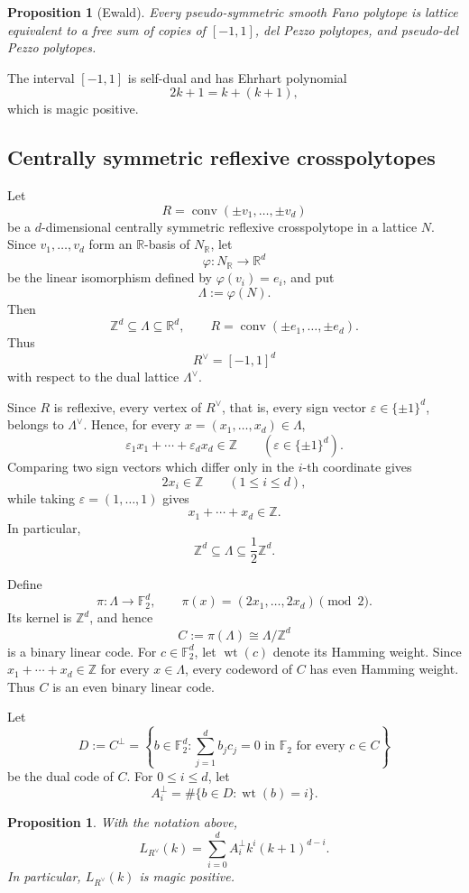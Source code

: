 \documentclass[10pt,a4paper]{amsart}
\newtheorem{Proposition}[Theorem]{Proposition}
\theoremstyle{definition}
\newcommand{\ZZ}{\mathbb Z}
\newcommand{\RR}{\mathbb R}
\newcommand{\conv}{\operatorname{conv}}
\begin{document}
\begin{Proposition}[Ewald]\label{prop:smooth-classification}
Every pseudo-symmetric smooth Fano polytope is lattice equivalent to a
free sum of copies of $[-1,1]$, del Pezzo polytopes, and pseudo-del Pezzo
polytopes.
\end{Proposition}


The interval $[-1,1]$ is self-dual and has Ehrhart polynomial
\[
2k+1=k+(k+1),
\]
which is magic positive.


\subsection{Centrally symmetric reflexive crosspolytopes}
\label{sec:crosspolytope}
Let
\[
R=\conv(\pm v_1,\ldots,\pm v_d)
\]
be a $d$-dimensional centrally symmetric reflexive crosspolytope
in a lattice $N$.  Since $v_1,\ldots,v_d$ form an $\RR$-basis of
$N_{\RR}$, let
\[
\varphi:N_{\RR}\longrightarrow\RR^d
\]
be the linear isomorphism defined by $\varphi(v_i)=e_i$, and put
\[
\Lambda:=\varphi(N).
\]
Then
\[
\ZZ^d\subseteq\Lambda\subseteq\RR^d,
\qquad
R=\conv(\pm e_1,\ldots,\pm e_d).
\]
Thus
\[
R^\vee=[-1,1]^d
\]
with respect to the dual lattice $\Lambda^\vee$.

Since $R$ is reflexive, every vertex of $R^\vee$, that is, every
sign vector $\varepsilon\in\{\pm1\}^d$, belongs to $\Lambda^\vee$.
Hence, for every $x=(x_1,\ldots,x_d)\in\Lambda$,
\[
\varepsilon_1x_1+\cdots+\varepsilon_dx_d\in\ZZ
\qquad
(\varepsilon\in\{\pm1\}^d).
\]
Comparing two sign vectors which differ only in the $i$-th coordinate
gives
\[
2x_i\in\ZZ
\qquad(1\le i\le d),
\]
while taking $\varepsilon=(1,\ldots,1)$ gives
\[
x_1+\cdots+x_d\in\ZZ.
\]
In particular,
\[
\ZZ^d\subseteq\Lambda\subseteq\frac12\ZZ^d.
\]

Define
\[
\pi:\Lambda\longrightarrow\mathbb F_2^d,
\qquad
\pi(x)
=
(2x_1,\ldots,2x_d)\pmod2.
\]
Its kernel is $\ZZ^d$, and hence
\[
C:=\pi(\Lambda)\cong\Lambda/\ZZ^d
\]
is a binary linear code.
For $c\in\mathbb F_2^d$, let $\operatorname{wt}(c)$ denote its
Hamming weight.
Since $x_1+\cdots+x_d\in\ZZ$ for every $x\in\Lambda$,
every codeword of $C$ has even Hamming weight.
Thus $C$ is an even binary linear code.

Let
\[
D:=C^\perp
=
\left\{
b\in\mathbb F_2^d:
\sum_{j=1}^d b_jc_j=0 \text{ in }\mathbb F_2
\text{ for every }c\in C
\right\}
\]
be the dual code of $C$.
For $0\le i\le d$, let
\[
A_i^\perp
=
\#\{b\in D:\operatorname{wt}(b)=i\}.
\]


\begin{Proposition}\label{prop:crosspolytope-magic}
With the notation above,
\[
L_{R^\vee}(k)
=
\sum_{i=0}^d
A_i^\perp k^i(k+1)^{d-i}.
\]
In particular, $L_{R^\vee}(k)$ is magic positive.
\end{Proposition}
\end{document}
